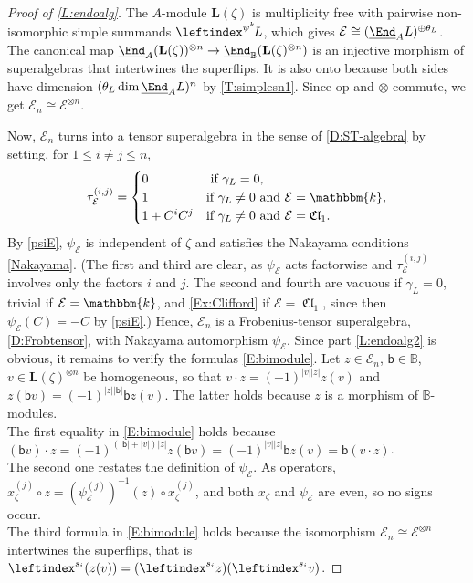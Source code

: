 \documentclass[a4paper,11pt]{amsart}
\newcommand{\uEnd}{\underline{\End}}
\numberwithin{equation}{subsection}
\theoremstyle{definition}
\theoremstyle{theorem}
\theoremstyle{remark}
\DeclareMathOperator\Cl{\mathfrak{Cl}}
\newcommand\bb{\mathsf{b}}
\newcommand\kk{\mathbbm{k}}
\newcommand{\Bo}{\mathbb{B}}
\begin{document}
\begin{proof}[Proof of \autoref{L:endoalg}]The $A$-module $\mathbf L(\zeta)$ is multiplicity free with pairwise non-isomorphic simple summands
  $\leftindex^{\psi^k}\!L$, which gives $\mathcal E \cong(\uEnd_AL)^{\oplus \theta_L}$. The canonical map
  $\uEnd_A(\mathbf L(\zeta))^{\otimes n}\to\uEnd_{\Bo}(\mathbf L(\zeta)^{\otimes n})$
is an injective morphism of superalgebras that intertwines the superflips. It  is also onto because both sides have
  dimension $(\theta_L\dim\uEnd_AL)^n$ by \autoref{T:simplesn1}. Since  $\mathrm{op}$ and $\otimes$ commute, we get $\mathcal E_n\cong\mathcal E^{\otimes n}$.

Now, ${\mathcal E_n}$ turns  into a tensor superalgebra in the sense of \autoref{D:ST-algebra} by setting, for $1\leq i\not= j\leq n$,
 \begin{equation}\label{tauE}
\tau^{(i,j)}_{\mathcal E}= \begin{cases}
0&\text{ if $\gamma_L=0$},\\
 1&\text{if $\gamma_L\not=0$ and $\mathcal E=\kk$},\\
1+C^{i}C^{j}&\text{if $\gamma_L\not=0$ and $\mathcal E=\Cl_1$}.
 \end{cases}
 \end{equation}
 By \autoref{psiE}, $\psi_{\mathcal E}$ is independent of $\zeta$ and satisfies the Nakayama
conditions \autoref{Nakayama}. (The first and third are clear, as $\psi_{\mathcal E}$ acts
factorwise and $\tau^{(i,j)}_{\mathcal E}$ involves only the factors $i$ and $j$. The second and
fourth are vacuous if $\gamma_L=0$, trivial if $\mathcal E=\kk$, and \autoref{Ex:Clifford} if
$\mathcal E=\Cl_1$, since then $\psi_{\mathcal E}(C)=-C$ by \autoref{psiE}.)
Hence, $\mathcal E_n$ is a Frobenius-tensor superalgebra, \autoref{D:Frobtensor}, with Nakayama automorphism $\psi_{\mathcal E}$. Since part \autoref{L:endoalg2} is obvious, it remains to verify the formulas \autoref{E:bimodule}.  Let
  $z\in\mathcal E_n$, $\bb\in\Bo$, $v\in\mathbf L(\zeta)^{\otimes n}$
  be homogeneous, so that $v\cdot z=(-1)^{|v||z|}z(v)$ and
  $z(\bb v)=(-1)^{|z||\bb|}\bb z(v)$. The latter holds because $z$ is a
  morphism of $\Bo$-modules. \\
  \noindent The first equality in \autoref{E:bimodule}
  holds because  $(\bb v)\cdot z=(-1)^{(|\bb|+|v|)|z|}z(\bb v)
      =(-1)^{|v||z|}\bb z(v)=\bb(v\cdot z)$.\\
\noindent   The second one restates the definition of
  $\psi_{\mathcal E}$. As operators, $x_\zeta^{(j)}\circ z
  =(\psi_{\mathcal E}^{(j)})^{-1}(z)\circ x_\zeta^{(j)}$, and both $x_\zeta$ and
  $\psi_{\mathcal E}$ are even, so no signs occur. \\
  \noindent  The third formula in  \autoref{E:bimodule} holds
  because the isomorphism $\mathcal E_n\cong\mathcal E^{\otimes n}$
  intertwines the superflips, that is
  $\leftindex^{s_i}(z(v))=(\leftindex^{s_i}z)(\leftindex^{s_i}v)$.
\end{proof}
\end{document}
